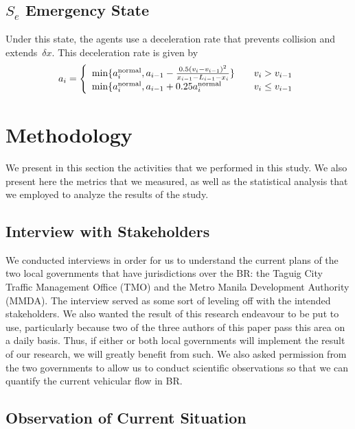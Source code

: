 \documentclass[preprint]{./acm_proc_article-sp}
\begin{document}
\subsection{$S_e$ Emergency State}

Under this state, the agents use a deceleration rate that prevents collision and extends~$\delta x$. This deceleration rate is given by
$$
  a_i = \left\{ \begin{array}{ll}
            \min\{a_i^{\rm normal}, a_{i-1}-\frac{0.5(v_i-v_{i-1})^2}{x_{i-1}-L_{i-1}-x_i}\} & \quad v_i > v_{i-1}\\
            \min\{a_i^{\rm normal}, a_{i-1}+0.25a_i^{\rm normal} & \quad v_i \le v_{i-1}
        \end{array}\right.
$$

\section{Methodology}\label{sec:method}

We present in this section the activities that we performed in this study. We also present here the metrics that we measured, as well as the statistical analysis that we employed to analyze the results of the study.

\pagebreak
\subsection{Interview with Stakeholders}

We conducted interviews in order for us to understand the current plans of the two local governments that have jurisdictions over the BR: the Taguig City Traffic Management Office (TMO) and the Metro Manila Development Authority (MMDA). The interview served as some sort of leveling off with the intended stakeholders. We also wanted the result of this research endeavour to be put to use, particularly because two of the three authors of this paper pass this area on a daily basis. Thus, if either or both local governments will implement the result of our research, we will greatly benefit from such. We also asked permission from the two governments to allow us to conduct scientific observations so that we can quantify the current vehicular flow in BR.



\subsection{Observation of Current Situation}
\end{document}
